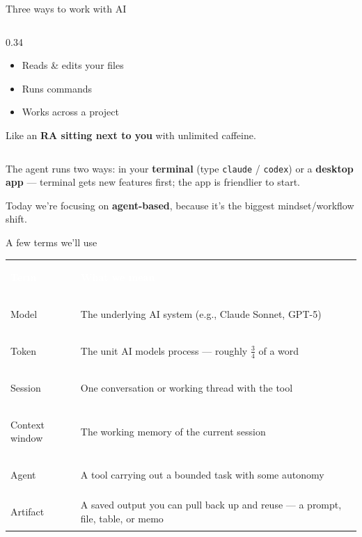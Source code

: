 \documentclass[aspectratio=169, 10pt]{beamer}
\begin{document}
\begin{frame}{Three ways to work with AI}
\begin{columns}[T]
\begin{column}{0.34\textwidth}
\begin{tcolorbox}
\vskip3pt
\begin{itemize}\setlength{\itemsep}{1pt}
  \item[\color{SlateTeal}\faCheck] Reads \& edits your files
  \item[\color{SlateTeal}\faCheck] Runs commands
  \item[\color{SlateTeal}\faCheck] Works across a project
\end{itemize}
\vskip2pt
{\color{CoolGray} Like an \textbf{RA sitting next to you} with unlimited caffeine.}
\end{tcolorbox}
\end{column}
\end{columns}
\vskip4pt
{\centering\scriptsize\color{CoolGray} The agent runs two ways: in your \textbf{terminal} (type \texttt{claude} / \texttt{codex}) or a \textbf{desktop app} --- terminal gets new features first; the app is friendlier to start.\par}
\vskip4pt
\begin{tcolorbox}[accentbox, halign=center, top=3pt, bottom=3pt]
\small Today we're focusing on \textbf{agent-based}, because it's the biggest mindset/workflow shift.
\end{tcolorbox}
\end{frame}

\begin{frame}{A few terms we'll use}
\vskip4pt
\begin{center}
{\small
\renewcommand{\arraystretch}{1.35}
\begin{tabular}{>{\bfseries\raggedright\arraybackslash}m{3.0cm} >{\raggedright\arraybackslash}m{9.6cm}}
\rowcolor{SlateTeal}
\textcolor{white}{\textbf{Term}} & \textcolor{white}{\textbf{What we mean}} \\
\rowcolor{PaleSage}
Model & The underlying AI system (e.g., Claude Sonnet, GPT-5) \\
\rowcolor{white}
Token & The unit AI models process --- roughly $\frac{3}{4}$ of a word \\
\rowcolor{PaleSage}
Session & One conversation or working thread with the tool \\
\rowcolor{white}
Context window & The working memory of the current session  \\
\rowcolor{PaleSage}
Agent & A tool carrying out a bounded task with some autonomy \\
\rowcolor{white}
Artifact & A saved output you can pull back up and reuse --- a prompt, file, table, or memo \\
\end{tabular}
}
\end{center}
\end{frame}
\end{document}
